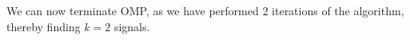 \begin{enumerate}
    \\ \\
    We can now terminate OMP, as we have performed 2 iterations of the algorithm, thereby finding $k=2$ signals.
\end{enumerate}